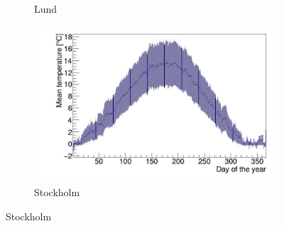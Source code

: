 \begin{figure}
\begin{subfigure}[b]{0.49\textwidth}
        \caption{Lund}    
    \end{subfigure}
    \hfill
    \begin{subfigure}[b]{0.49\textwidth}
    \centering
    \includegraphics[width=\textwidth]{STH_A.jpg}
        \caption{Stockholm}    
    \end{subfigure}
\end{figure}






